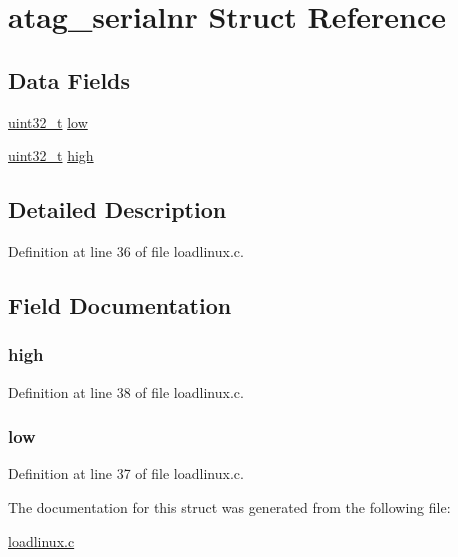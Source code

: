 \hypertarget{structatag__serialnr}{\section{atag\-\_\-serialnr \-Struct \-Reference}
\label{structatag__serialnr}
}
\subsection*{\-Data \-Fields}
\begin{DoxyCompactItemize}
\item 
\hyperlink{arch__types_8h_a435d1572bf3f880d55459d9805097f62}{uint32\-\_\-t} \hyperlink{structatag__serialnr_a864f755b7008df85b29726891bdd4fbd}{low}
\item 
\hyperlink{arch__types_8h_a435d1572bf3f880d55459d9805097f62}{uint32\-\_\-t} \hyperlink{structatag__serialnr_a0d90a9fe74bca2dccde7f81cddfdf7b0}{high}
\end{DoxyCompactItemize}


\subsection{\-Detailed \-Description}


\-Definition at line 36 of file loadlinux.\-c.



\subsection{\-Field \-Documentation}
\hypertarget{structatag__serialnr_a0d90a9fe74bca2dccde7f81cddfdf7b0}{
\subsubsection[{high}]{ {\bf high}}}\label{structatag__serialnr_a0d90a9fe74bca2dccde7f81cddfdf7b0}


\-Definition at line 38 of file loadlinux.\-c.

\hypertarget{structatag__serialnr_a864f755b7008df85b29726891bdd4fbd}{
\subsubsection[{low}]{ {\bf low}}}\label{structatag__serialnr_a864f755b7008df85b29726891bdd4fbd}


\-Definition at line 37 of file loadlinux.\-c.



\-The documentation for this struct was generated from the following file\-:\begin{DoxyCompactItemize}
\item 
\hyperlink{loadlinux_8c}{loadlinux.\-c}\end{DoxyCompactItemize}
